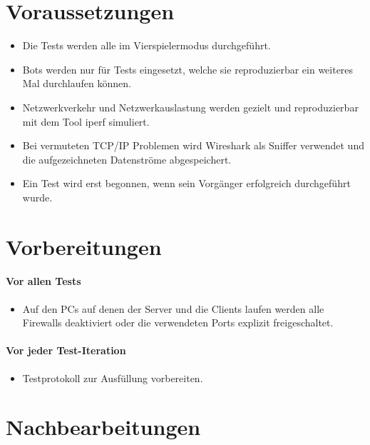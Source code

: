 \documentclass[12pt,halfparskip]{scrartcl}
\begin{document}

\section{Voraussetzungen} %
\label{sec:voraussetzungen}
\begin{itemize}
	\item Die Tests werden alle im Vierspielermodus durchgeführt.
	\item Bots werden nur für Tests eingesetzt, welche sie reproduzierbar ein weiteres Mal durchlaufen können.
	\item Netzwerkverkehr und Netzwerkauslastung werden gezielt und reproduzierbar mit dem Tool iperf simuliert.
	\item Bei vermuteten TCP/IP Problemen wird Wireshark als Sniffer verwendet und die aufgezeichneten Datenströme abgespeichert.
	\item Ein Test wird erst begonnen, wenn sein Vorgänger erfolgreich durchgeführt wurde.
\end{itemize}

\section{Vorbereitungen} %
\label{sec:vorbereitungen}
\paragraph{Vor allen Tests}\label{ssub:vorbereitungen_vor_allen_tests} %
	\begin{itemize}
		\item Auf den PCs auf denen der Server und die Clients laufen werden alle Firewalls deaktiviert oder die verwendeten Ports explizit freigeschaltet.
	\end{itemize}
\paragraph{Vor jeder Test-Iteration}\label{ssub:vorbereitungen_vor_jeder_testiteration} %
	\begin{itemize}
		\item Testprotokoll zur Ausfüllung vorbereiten.
	\end{itemize}

\section{Nachbearbeitungen}\label{sec:nachbearbeitungen} %
\end{document}
